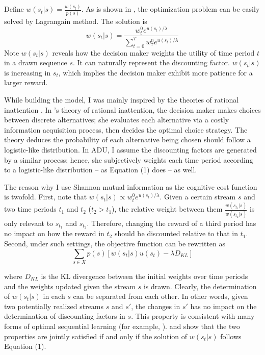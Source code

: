 \documentclass[
  12pt,
]{article}
\begin{document}
Define \(w(s_t|s) = \frac{w(s_t)}{p(s)}\). As is shown in
\citet{matejka_rational_2015}, the optimization problem can be easily
solved by Lagrangain method. The solution is\[ \tag{1}
w(s_t|s) =\frac{w_t^0e^{u(s_t)/\lambda}}{\sum_{t=0}^T w_\tau^0 e^{u(s_t)/\lambda}}
\]Note \(w(s_t|s)\) reveals how the decision maker weights the utility
of time period \(t\) in a drawn sequence \(s\). It can naturally
represent the discounting factor. \(w(s_t|s)\) is increasing in \(s_t\),
which implies the decision maker exhibit more patience for a larger
reward.

While building the model, I was mainly inspired by the theories of
rational inattention
\citep{matejka_rational_2015, jung_discrete_2019, mackowiak_rational_2023}.
In \citet{matejka_rational_2015}'s theory of rational inattention, the
decision maker makes choices between discrete alternatives; she
evaluates each alternative via a costly information acquisition process,
then decides the optimal choice strategy. The theory deduces the
probability of each alternative being chosen should follow a
logistic-like distribution. In ADU, I assume the discounting factors are
generated by a similar process; hence, she subjectively weights each
time period according to a logistic-like distribution -- as Equation (1)
does -- as well.

The reason why I use Shannon mutual information as the cognitive cost
function is twofold. First, note that
\(w(s_t|s) \propto w^0_t e^{u(s_t)/\lambda}\). Given a certain stream
\(s\) and two time periods \(t_1\) and \(t_2\) (\(t_2>t_1\)), the
relative weight between them \(\frac{w(s_{t_1}|s)}{w(s_{t_2}|s)}\) is
only relevant to \(s_{t_1}\) and \(s_{t_2}\). Therefore, changing the
reward of a third period has no impact on how the reward in \(t_2\)
should be discounted relative to that in \(t_1\). Second, under such
settings, the objective function can be rewritten as\[
\sum_{s\in X} p(s)[w(s_t|s)u(s_t) - \lambda D_{KL}]
\]

where \(D_{KL}\) is the KL divergence between the initial weights over
time periods and the weights updated given the stream \(s\) is drawn.
Clearly, the determination of \(w(s_t|s)\) in each \(s\) can be
separated from each other. In other words, given two potentially
realized streams \(s\) and \(s'\), the changes in \(s'\) has no impact
on the determination of discounting factors in \(s\). This property is
consistent with many forms of optimal sequential learning (for example,
\citet{zhong_optimal_2022} ). \citet{matejka_rational_2015} and
\citet{caplin_rationally_2022} show that the two properties are jointly
satisfied if and only if the solution of \(w(s_t|s)\) follows Equation
(1).
\end{document}
